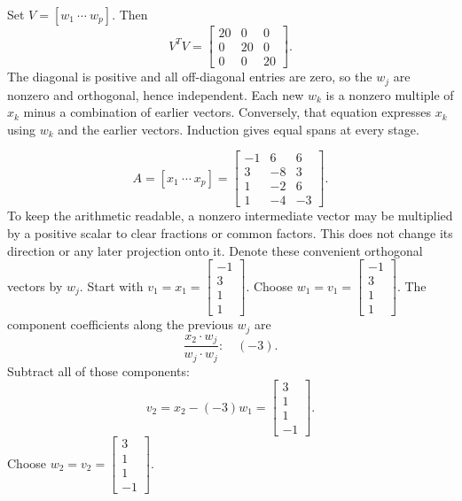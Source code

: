 Set $V=[w_1\ \cdots\ w_p]$. Then
\[V^TV=\left[\begin{array}{rrr}20&0&0\\0&20&0\\0&0&20\end{array}\right].\]
The diagonal is positive and all off-diagonal entries are zero, so the $w_j$ are nonzero and orthogonal, hence independent. Each new $w_k$ is a nonzero multiple of $x_k$ minus a combination of earlier vectors. Conversely, that equation expresses $x_k$ using $w_k$ and the earlier vectors. Induction gives equal spans at every stage.

\[A=[x_1\ \cdots\ x_p]=\left[\begin{array}{rrr}-1&6&6\\3&-8&3\\1&-2&6\\1&-4&-3\end{array}\right].\]
To keep the arithmetic readable, a nonzero intermediate vector may be multiplied by a positive scalar to clear fractions or common factors. This does not change its direction or any later projection onto it. Denote these convenient orthogonal vectors by $w_j$.
Start with $v_1=x_1=\left[\begin{array}{r}-1\\3\\1\\1\end{array}\right]$.
Choose $w_{1}=v_{1}=\left[\begin{array}{r}-1\\3\\1\\1\end{array}\right]$.
The component coefficients along the previous $w_j$ are
\[\frac{x_{2}\cdot w_j}{w_j\cdot w_j}:\quad(-3).\]
Subtract all of those components:
\[v_{2}=x_{2}-(-3)w_{1}=\left[\begin{array}{r}3\\1\\1\\-1\end{array}\right].\]
Choose $w_{2}=v_{2}=\left[\begin{array}{r}3\\1\\1\\-1\end{array}\right]$.
